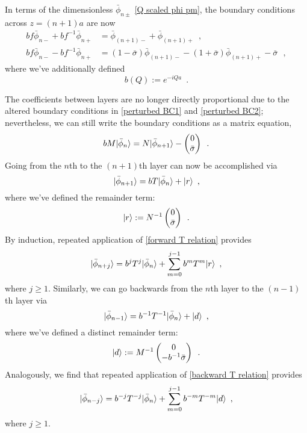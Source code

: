 \documentclass{article}
\newcommand{\bpm}{\begin{pmatrix}}
\newcommand{\epm}{\end{pmatrix}}
\DeclarePairedDelimiter\ket{\lvert}{\rangle}
\begin{document}
In terms of the dimensionless $\bar\phi_{n\pm}$ \eqref{Q scaled phi pm}, the boundary conditions across $z=(n+1)a$ are now
\begin{align}
    \label{perturbed BC1}
    bf \bar\phi_{n-} + bf^{-1}\bar\phi_{n+} &= \bar\phi_{(n+1)-} + \bar\phi_{(n+1)+}
    \,\,\,,
    \\
    \label{perturbed BC2}
    bf \bar\phi_{n-} - bf^{-1}\bar\phi_{n+} &= (1-\bar\sigma)\bar\phi_{(n+1)-}-(1+\bar\sigma)\bar\phi_{(n+1)+} - \bar\sigma
    \,\,\,\,,
\end{align}
where we've additionally defined
\begin{equation}
    \label{b def}
    b(Q):=e^{-i Q a}
    \,\,\,.
\end{equation}

The coefficients between layers are no longer directly proportional due to the altered boundary conditions in \eqref{perturbed BC1} and \eqref{perturbed BC2}; nevertheless, we can still write the boundary conditions as a matrix equation,
\begin{equation}
    \label{perturbed matrix BC}
    bM\ket{\bar\phi_n} = N\ket{\bar \phi_{n+1}}
    -
    \bpm
    0
    \\
    \bar\sigma
    \epm
    \,\,\,.
\end{equation}
Going from the $n$th to the $(n+1)$th layer can now be accomplished via
\begin{equation}
    \label{forward T relation}
    \ket{\bar\phi_{n+1}}
    =
    bT\ket{\bar\phi_n}+\ket r
    \,\,\,,
\end{equation}
where we've defined the remainder term:
\begin{equation}
    \label{r def}
    \ket r := N^{-1}\bpm
    0
    \\
    \bar\sigma
    \epm
    \,\,\,.
\end{equation}
By induction, repeated application of \eqref{forward T relation} provides
\begin{equation}
    \label{forward j T relation}
    \ket{\bar\phi_{n+j}} = b^j T^j\ket{\bar\phi_{n}} + \sum_{m=0}^{j-1} b^m T^m\ket r
    \,\,\,,
\end{equation}
where $j\ge1$.  Similarly, we can go backwards from the $n$th layer to the $(n-1)$th layer via
\begin{equation}
    \label{backward T relation}
    \ket{\bar\phi_{n-1}} = b^{-1}T^{-1}\ket{\bar\phi_{n}} + \ket d
    \,\,\,,
\end{equation}
where we've defined a distinct remainder term:
\begin{equation}
    \label{d def}
    \ket d:=M^{-1}
    \bpm
    0
    \\
    -b^{-1}\bar\sigma
    \epm
    \,\,\,.
\end{equation}
Analogously, we find that repeated application of \eqref{backward T relation} provides
\begin{equation}
    \label{backward j T relation}
    \ket{\bar\phi_{n-j}}
    =
    b^{-j} T^{-j}\ket{\bar\phi_n} +\sum_{m=0}^{j-1}b^{-m}T^{-m}\ket d
    \,\,\,,
\end{equation}
where $j\ge1$.
\end{document}
